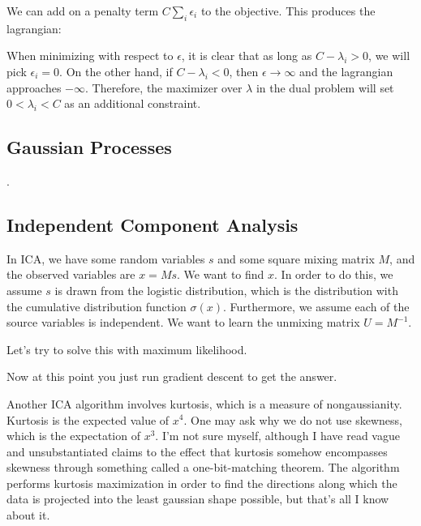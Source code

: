 \documentclass[12pt]{article}
\begin{document}
We can add on a penalty term $C\sum_i \epsilon_i$ to the objective. This produces the lagrangian:


When minimizing with respect to $\epsilon$, it is clear that as long as $C-\lambda_i > 0$, we will pick $\epsilon_i = 0$. On the other hand, if $C -\lambda_i < 0$, then $\epsilon \rightarrow \infty$ and the lagrangian approaches $- \infty$. Therefore, the maximizer over $\lambda$ in the dual problem will set $0 < \lambda_i < C$ as an additional constraint.

\subsection{Gaussian Processes}
.
\subsection{Independent Component Analysis}

In ICA, we have some random variables $s$ and some square mixing matrix $M$, and the observed variables are $x = Ms$. We want to find $x$. In order to do this, we assume $s$ is drawn from the logistic distribution, which is the distribution with the cumulative distribution function $\sigma(x)$. Furthermore, we assume each of the source variables is independent. We want to learn the unmixing matrix $U = M^{-1}$. 

Let's try to solve this with maximum likelihood.


Now at this point you just run gradient descent to get the answer. 

Another ICA algorithm involves kurtosis, which is a measure of nongaussianity. Kurtosis is the expected value of $x^4$. One may ask why we do not use skewness, which is the expectation of $x^3$. I'm not sure myself, although I have read vague and unsubstantiated claims to the effect that kurtosis somehow encompasses skewness through something called a one-bit-matching theorem.
The algorithm performs kurtosis maximization in order to find the directions along which the data is projected into the least gaussian shape possible, but that's all I know about it.
\end{document}
